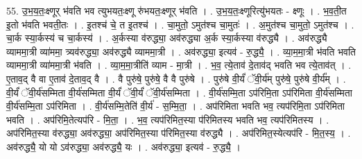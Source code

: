 \documentclass[17pt]{extarticle}
\begin{document}
55. उ॒भ॒य॒तः॒क्ष्णूर् भ॑वति भव त्युभयतः॒क्ष्णू रु॑भयतः॒क्ष्णूर् भ॑वति । . उ॒भ॒य॒तः॒क्ष्णूरित्यु॑भयतः - क्ष्णूः । . भ॒व॒ती॒त इ॒तो भ॑वति भवती॒तः । . इ॒तश्च॑ चे॒ त इ॒तश्च॑ । . चा॒मुतो॒ ऽमुत॑श्च चा॒मुतः॑ । . अ॒मुत॑श्च चा॒मुतो॒ ऽमुत॑श्च । . चा॒र्क स्या॒र्कस्य॑ च चा॒र्कस्य॑ । . अ॒र्कस्या व॑रुद्ध्या॒ अव॑रुद्ध्या अ॒र्क स्या॒र्कस्या व॑रुद्ध्यै । . अव॑रुद्ध्यै व्याममा॒त्री व्या॑ममा॒ त्र्यव॑रुद्ध्या॒ अव॑रुद्ध्यै व्याममा॒त्री । . अव॑रुद्ध्या॒ इत्यव॑ - रु॒द्ध्यै॒ । . व्या॒म॒मा॒त्री भ॑वति भवति व्याममा॒त्री व्या॑ममा॒त्री भ॑वति । . व्या॒म॒मा॒त्रीति॑ व्याम - मा॒त्री । . भ॒व॒ त्ये॒ताव॑ दे॒ताव॑द् भवति भव त्ये॒ताव॑त् । . ए॒ताव॒द् वै वा ए॒ताव॑ दे॒ताव॒द् वै । . वै पुरु॑षे॒ पुरु॑षे॒ वै वै पुरु॑षे । . पुरु॑षे वी॒र्यं॑ ॅवी॒र्य॑म् पुरु॑षे॒ पुरु॑षे वी॒र्य᳚म् । . वी॒र्यं॑ ॅवी॒र्य॑सम्मिता वी॒र्य॑सम्मिता वी॒र्यं॑ ॅवी॒र्यं॑ ॅवी॒र्य॑सम्मिता । . वी॒र्य॑सम्मि॒ता ऽप॑रिमि॒ता ऽप॑रिमिता वी॒र्य॑सम्मिता वी॒र्य॑सम्मि॒ता ऽप॑रिमिता । . वी॒र्य॑सम्मि॒तेति॑ वी॒र्य॑ - स॒म्मि॒ता॒ । . अप॑रिमिता भवति भव॒ त्यप॑रिमि॒ता ऽप॑रिमिता भवति । . अप॑रिमि॒तेत्यप॑रि - मि॒ता॒ । . भ॒व॒ त्यप॑रिमित॒स्या प॑रिमितस्य भवति भव॒ त्यप॑रिमितस्य । . अप॑रिमित॒स्या व॑रुद्ध्या॒ अव॑रुद्ध्या॒ अप॑रिमित॒स्या प॑रिमित॒स्या व॑रुद्ध्यै । . अप॑रिमित॒स्येत्यप॑रि - मि॒त॒स्य॒ । . अव॑रुद्ध्यै॒ यो यो ऽव॑रुद्ध्या॒ अव॑रुद्ध्यै॒ यः । . अव॑रुद्ध्या॒ इत्यव॑ - रु॒द्ध्यै॒ । \newline
\end{document}
